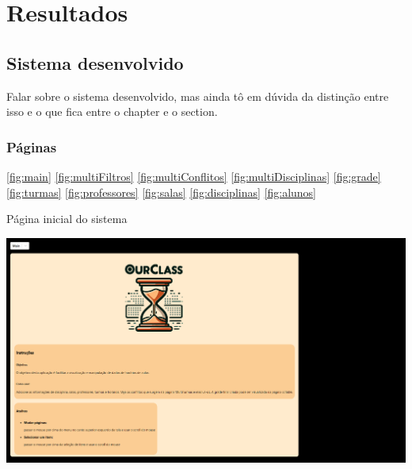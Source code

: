 \chapter{Resultados} \label{chap:resultados} %






\section{Sistema desenvolvido}

Falar sobre o sistema desenvolvido, mas ainda tô em dúvida da distinção entre isso e o que fica entre o chapter e o section.

\subsection{Páginas}

\autoref{fig:main}
\autoref{fig:multiFiltros}
\autoref{fig:multiConflitos}
\autoref{fig:multiDisciplinas}
\autoref{fig:grade}
\autoref{fig:turmas}
\autoref{fig:professores}
\autoref{fig:salas}
\autoref{fig:disciplinas}
\autoref{fig:alunos}

\begin{MyCenteredFigure} \caption{Página inicial do sistema} \label{fig:main}
  \includegraphics[width=\textwidth]{files/img/2.02!7-resultados/1-Main.png}
\end{MyCenteredFigure}

